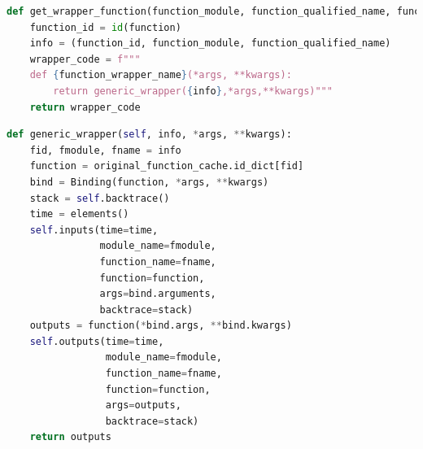 \documentclass[11pt]{article}
\newcommand{\tristan}[1]{\color{orange}\textbf{From Tristan:} #1\color{black}\xspace}
\newcommand{\pytracer}[0]{PyTracer\xspace}
\begin{document}
%




\begin{listing}
    \centering
\begin{lstlisting}[language=Python,style=customPython]
def get_wrapper_function(function_module, function_qualified_name, function, function_wrapper_name):
    function_id = id(function)
    info = (function_id, function_module, function_qualified_name)
    wrapper_code = f"""
    def {function_wrapper_name}(*args, **kwargs):
        return generic_wrapper({info},*args,**kwargs)"""
    return wrapper_code
\end{lstlisting}
    \caption{Function to create the instrumented version of a function. 
    This function returns the instrumented function as a string (\texttt{wrapper\_code}) that 
    will be turned into a Python object with the \texttt{compile} built-in function.}
    \label{fig:wrapper_creation}
\end{listing}


\begin{listing}
    \centering
\begin{lstlisting}[language=Python,style=customPython,]
def generic_wrapper(self, info, *args, **kwargs):
    fid, fmodule, fname = info
    function = original_function_cache.id_dict[fid]
    bind = Binding(function, *args, **kwargs)
    stack = self.backtrace()
    time = elements()
    self.inputs(time=time,
                module_name=fmodule,
                function_name=fname,
                function=function,
                args=bind.arguments,
                backtrace=stack)
    outputs = function(*bind.args, **bind.kwargs)
    self.outputs(time=time,
                 module_name=fmodule,
                 function_name=fname,
                 function=function,
                 args=outputs,
                 backtrace=stack)
    return outputs
\end{lstlisting}
    \caption{\pytracer's wrapper function. 
    The \texttt{original\_function\_cache} maintains a mapping between the original function and its identifier (available through 
    \texttt{id} built-in function). Once the original function retrieved, the arguments are saved to the traces (through function 
    \texttt{self.inputs}). The actual function is called and the result is saved (function \texttt{self.outputs}) then returned.
    }
    \label{fig:generic_wrapper}
\end{listing}
\end{document}
